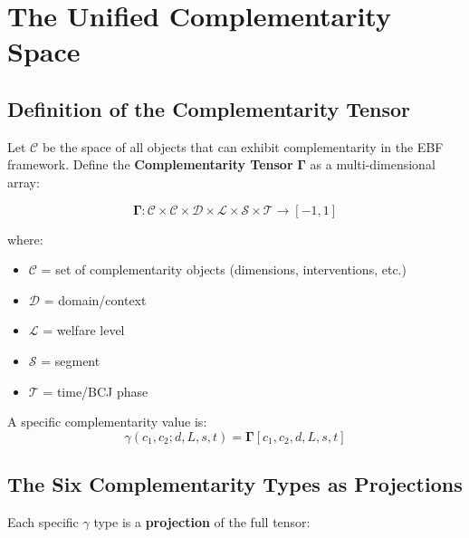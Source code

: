 \section{The Unified Complementarity Space}
\label{sec:gtc-space}

\subsection{Definition of the Complementarity Tensor}

\begin{definition}
Let $\mathcal{C}$ be the space of all objects that can exhibit complementarity
in the EBF framework. Define the \textbf{Complementarity Tensor} $\boldsymbol{\Gamma}$
as a multi-dimensional array:

\begin{equation}
\boxed{
\boldsymbol{\Gamma} : \mathcal{C} \times \mathcal{C} \times \mathcal{D} \times \mathcal{L} \times \mathcal{S} \times \mathcal{T} \to [-1, 1]
}
\end{equation}

where:
\begin{itemize}[nosep]
    \item $\mathcal{C}$ = set of complementarity objects (dimensions, interventions, etc.)
    \item $\mathcal{D}$ = domain/context
    \item $\mathcal{L}$ = welfare level
    \item $\mathcal{S}$ = segment
    \item $\mathcal{T}$ = time/BCJ phase
\end{itemize}

A specific complementarity value is:
\begin{equation}
\gamma(c_1, c_2; d, L, s, t) = \boldsymbol{\Gamma}[c_1, c_2, d, L, s, t]
\end{equation}
\end{definition}

\subsection{The Six Complementarity Types as Projections}

Each specific $\gamma$ type is a \textbf{projection} of the full tensor:

